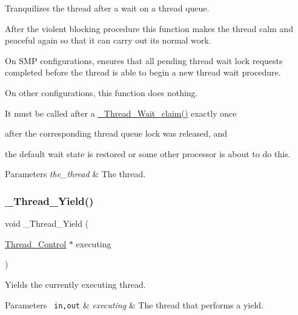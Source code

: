 Tranquilizes the thread after a wait on a thread queue. 

After the violent blocking procedure this function makes the thread calm and peaceful again so that it can carry out its normal work.

On S\+MP configurations, ensures that all pending thread wait lock requests completed before the thread is able to begin a new thread wait procedure.

On other configurations, this function does nothing.

It must be called after a \mbox{\hyperlink{group__RTEMSScoreThread_ga032320598e809cb93d80e985906fb393}{\+\_\+\+Thread\+\_\+\+Wait\+\_\+claim()}} exactly once
\begin{DoxyItemize}
\item after the corresponding thread queue lock was released, and
\item the default wait state is restored or some other processor is about to do this.
\end{DoxyItemize}


\begin{DoxyParams}{Parameters}
{\em the\+\_\+thread} & The thread. \\
\hline
\end{DoxyParams}
\mbox{\label{group__RTEMSScoreThread_ga82c1e28e7fcc27135782ff978dcdcb8f}} 
\subsubsection{\texorpdfstring{\_Thread\_Yield()}{\_Thread\_Yield()}}
{\footnotesize\ttfamily void \+\_\+\+Thread\+\_\+\+Yield (\begin{DoxyParamCaption}\item[{\mbox{\hyperlink{struct__Thread__Control}{Thread\+\_\+\+Control}} $\ast$}]{executing }\end{DoxyParamCaption})}



Yields the currently executing thread. 


\begin{DoxyParams}[1]{Parameters}
\mbox{\texttt{ in,out}}  & {\em executing} & The thread that performs a yield. \\
\hline
\end{DoxyParams}
\mbox{\label{group__RTEMSScoreThread_ga5dc64d34fc67591fa08d18fb6aa055ca}} 

